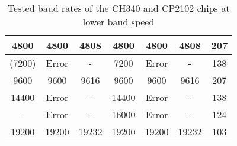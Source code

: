 \begin{table}[H]
\begin{center}
\begin{tabular}{| c | c | c || c | c | c || c |}
    \hline
       4800    & 4800  &   4808    &   4800    &  4800  &   4808    &   207  \\
    \hline
      (7200)   & Error &   -       &   7200    &  Error &    -      &   138  \\
    \hline
       9600    & 9600  &   9616    &   9600    &  9600  &   9616    &   207  \\
    \hline
      14400    & Error &   -       &  14400    & Error  &    -      &   138  \\
    \hline
        -      & Error &   -       &  16000    & Error  &    -      &   124  \\
    \hline
      19200    & 19200  &  19232   &   19200   &  19200 &  19232    &   103  \\
    \hline
    \end{tabular}
  \end{center}
  \caption{Tested baud rates of the CH340 and CP2102 chips at lower baud speed}
  \label{tab:CH340baudl}
\end{table}
 



